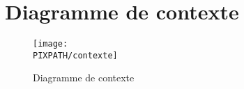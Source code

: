 \section{Diagramme de contexte}


\begin{center}
\begin{figure}[!h]
\texttt{[image: \\PIXPATH/contexte]}
\label{sg}
\caption{Diagramme de contexte}
\end{figure}
\end{center}

\vfill
\pagebreak
